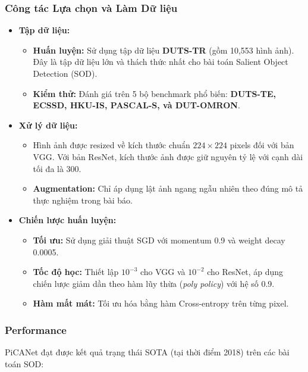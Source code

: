 \subsubsection{Công tác Lựa chọn và Làm Dữ liệu}
\begin{itemize}
    \item \textbf{Tập dữ liệu:}
    \begin{itemize}
        \item \textbf{Huấn luyện:} Sử dụng tập dữ liệu \textbf{DUTS-TR} (gồm 10,553 hình ảnh). Đây là tập dữ liệu lớn và thách thức nhất cho bài toán Salient Object Detection (SOD).
        \item \textbf{Kiểm thử:} Đánh giá trên 5 bộ benchmark phổ biến: \textbf{DUTS-TE, ECSSD, HKU-IS, PASCAL-S, và DUT-OMRON}.
    \end{itemize}

    \item \textbf{Xử lý dữ liệu:}
    \begin{itemize}
        \item Hình ảnh được resized về kích thước chuẩn $224 \times 224$ pixels đối với bản VGG. Với bản ResNet, kích thước ảnh được giữ nguyên tỷ lệ với cạnh dài tối đa là 300.
        \item \textbf{Augmentation:} Chỉ áp dụng lật ảnh ngang ngẫu nhiên theo đúng mô tả thực nghiệm trong bài báo.
    \end{itemize}

    \item \textbf{Chiến lược huấn luyện:}
    \begin{itemize}
        \item \textbf{Tối ưu:} Sử dụng giải thuật SGD với momentum 0.9 và weight decay 0.0005.
        \item \textbf{Tốc độ học:} Thiết lập $10^{-3}$ cho VGG và $10^{-2}$ cho ResNet, áp dụng chiến lược giảm dần theo hàm lũy thừa (\textit{poly policy}) với hệ số 0.9.
        \item \textbf{Hàm mất mát:} Tối ưu hóa bằng hàm Cross-entropy trên từng pixel.
    \end{itemize}
\end{itemize}

\subsubsection{Performance}
\noindent PiCANet đạt được kết quả trạng thái SOTA (tại thời điểm 2018) trên các bài toán SOD:

